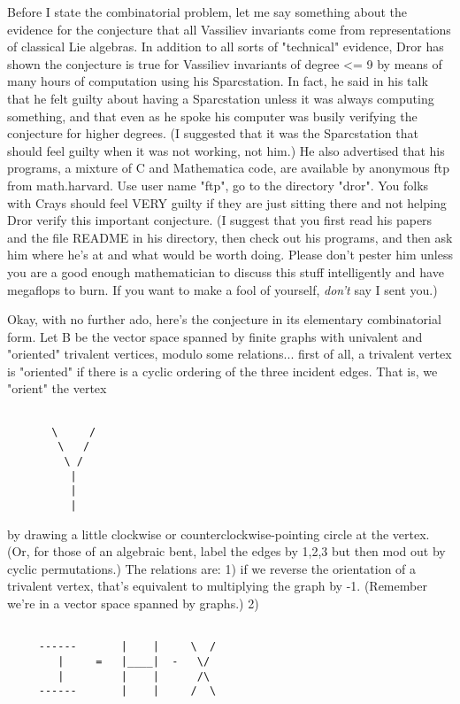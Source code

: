 Before I state the combinatorial problem, let me say
something about the evidence for the conjecture that all Vassiliev
invariants come from representations of classical Lie algebras.  In
addition to all sorts of "technical" evidence, Dror has shown the 
conjecture is true for Vassiliev invariants of degree <= 9 by means
of many hours of computation using his Sparcstation.  In fact, he said
in his talk that he felt guilty about having a Sparcstation unless it
was always computing something, and that even as he spoke his computer
was busily verifying the conjecture for higher degrees.  (I suggested
that it was the Sparcstation that should feel guilty when it was not
working, not him.)  He also advertised that his programs, a mixture of C
and Mathematica code, are available by anonymous ftp from math.harvard.
Use user name "ftp", go to the directory "dror".  You folks with Crays 
should feel VERY guilty if they are just sitting there and not helping
Dror verify this important conjecture. (I suggest that you first read his
papers and the file README in his directory, then check out his
programs, and then ask him where he's at and what would be worth doing.
Please don't pester him unless you are a good enough mathematician to
discuss this stuff intelligently and have megaflops to burn.  If you
want to make a fool of yourself, \emph{don't} say I sent you.)  

Okay, with no further ado, here's the conjecture in its elementary
combinatorial form.  Let B be the vector space spanned by finite graphs with
univalent and "oriented" trivalent vertices, modulo some
relations... first of all, a trivalent vertex is "oriented" if there is
a cyclic ordering of the three incident edges.  That is, we "orient" the
vertex 



\begin{verbatim}

       \     /
        \   /
         \ /
          |
          |
          |
\end{verbatim}
    

by drawing a little clockwise or counterclockwise-pointing circle at the
vertex.  (Or, for those of an algebraic bent, label the edges by 1,2,3
but then mod out by cyclic permutations.)  The relations are: 1)  if we
reverse the orientation of a trivalent vertex, that's equivalent to
multiplying the graph by -1.  (Remember we're in a vector space spanned
by graphs.)  2)  


\begin{verbatim}

	 ------       |    |     \  /
	    |     =   |____|  -   \/
	    |         |    |      /\
	 ------       |    |     /  \
\end{verbatim}
    


